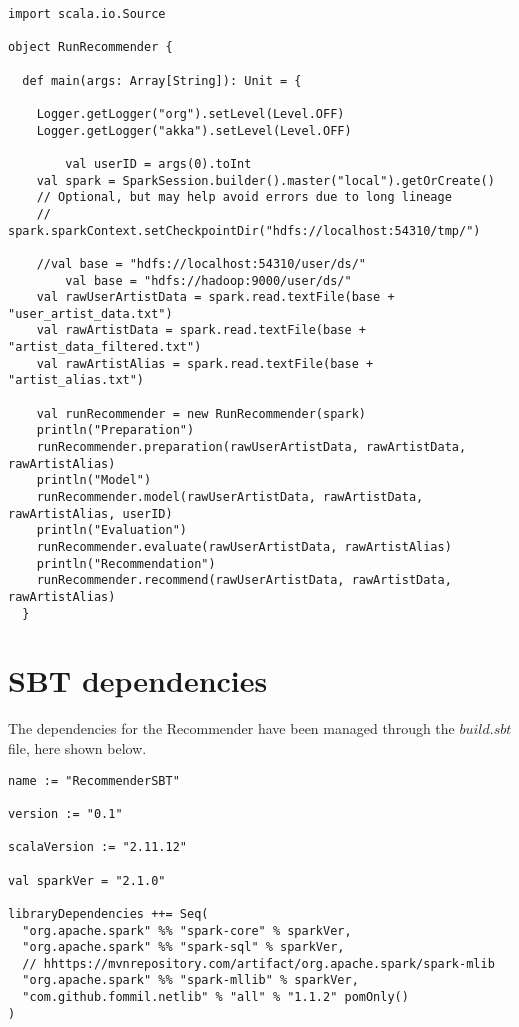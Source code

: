 \documentclass[11pt,a4paper,titlepage]{article}
\begin{document}
\begin{lstlisting}[style=myScalastyle]
import scala.io.Source

object RunRecommender {

  def main(args: Array[String]): Unit = {

    Logger.getLogger("org").setLevel(Level.OFF)
    Logger.getLogger("akka").setLevel(Level.OFF)

        val userID = args(0).toInt
    val spark = SparkSession.builder().master("local").getOrCreate()
    // Optional, but may help avoid errors due to long lineage
    // spark.sparkContext.setCheckpointDir("hdfs://localhost:54310/tmp/")

    //val base = "hdfs://localhost:54310/user/ds/"
        val base = "hdfs://hadoop:9000/user/ds/"
    val rawUserArtistData = spark.read.textFile(base + "user_artist_data.txt")
    val rawArtistData = spark.read.textFile(base + "artist_data_filtered.txt")
    val rawArtistAlias = spark.read.textFile(base + "artist_alias.txt")

    val runRecommender = new RunRecommender(spark)
    println("Preparation")
    runRecommender.preparation(rawUserArtistData, rawArtistData, rawArtistAlias)
    println("Model")
    runRecommender.model(rawUserArtistData, rawArtistData, rawArtistAlias, userID)
    println("Evaluation")
    runRecommender.evaluate(rawUserArtistData, rawArtistAlias)
    println("Recommendation")
    runRecommender.recommend(rawUserArtistData, rawArtistData, rawArtistAlias)
  }
\end{lstlisting}
\section{SBT dependencies}
The dependencies for the Recommender have been managed through the $build.sbt$ file, here shown below.

\begin{lstlisting}[style=myScalastyle]
name := "RecommenderSBT"

version := "0.1"

scalaVersion := "2.11.12"

val sparkVer = "2.1.0"

libraryDependencies ++= Seq(
  "org.apache.spark" %% "spark-core" % sparkVer,
  "org.apache.spark" %% "spark-sql" % sparkVer,
  // hhttps://mvnrepository.com/artifact/org.apache.spark/spark-mlib
  "org.apache.spark" %% "spark-mllib" % sparkVer,
  "com.github.fommil.netlib" % "all" % "1.1.2" pomOnly()
)
\end{lstlisting}
\end{document}
